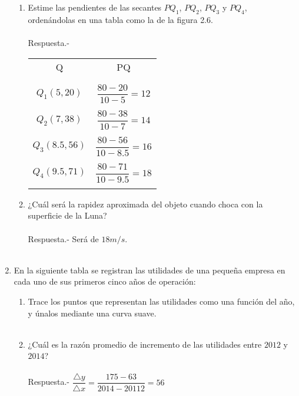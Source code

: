 \begin{enumerate}
\begin{enumerate}[\bfseries a)]
    \item Estime las pendientes de las secantes $PQ_1$, $PQ_2$, $PQ_3$ y $PQ_4$, ordenándolas en una tabla como la de la figura 2.6.\\\\
	Respuesta.-\; 
	\begin{center}
	    \begin{tabular}{c|c}
		Q & PQ \\\\	
		\hline\\
		$Q_1(5,20)$ & $\dfrac{80-20}{10-5} = 12$\\\\
		$Q_2(7,38)$ & $\dfrac{80-38}{10-7} = 14$\\\\
		$Q_3(8.5,56)$ & $\dfrac{80-56}{10-8.5} = 16$\\\\
		$Q_4(9.5,71)$ & $\dfrac{80-71}{10-9.5} = 18$\\\\
	    \end{tabular}
	\end{center}

    \item ¿Cuál será la rapidez aproximada del objeto cuando choca con la superficie de la Luna?\\\\
	Respuesta.-\; Será de  $18m/s$.\\\\ 

\end{enumerate}

\item En la siguiente tabla se registran las utilidades de una pequeña empresa en cada uno de sus primeros cinco años de operación:
\begin{enumerate}[\bfseries a)]

    \item Trace los puntos que representan las utilidades como una función del año, y únalos mediante una curva suave.\\\\

    \item ¿Cuál es la razón promedio de incremento de las utilidades entre $2012$ y $2014$?\\\\
	Respuesta.-\; $\dfrac{\triangle y}{\triangle x} = \dfrac{175-63}{2014-20112} = 56$\\\\ 


\end{enumerate}
\end{enumerate}
